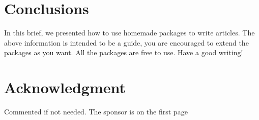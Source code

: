 \documentclass[conference]{IEEEtran}
\begin{document}
\IEEEpubidadjcol


\section{Conclusions}\label{sec:conclusions}
In this brief, we presented how to use homemade packages to write articles.
The above information is intended to be a guide, you are encouraged to extend the packages as you want.
All the packages are free to use.
Have a good writing! 


\section*{Acknowledgment}
Commented if not needed. The sponsor is on the first page




\end{document}
